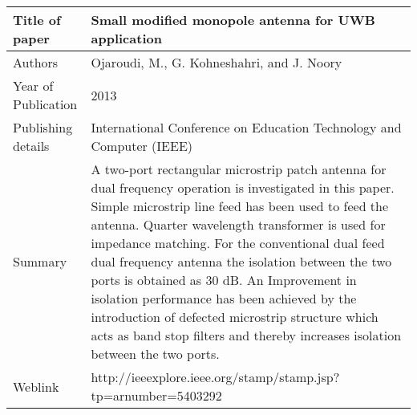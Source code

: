 \documentclass{article}
\begin{document}
\begin{table}
  \centering
	\begin{tabular}{ |l|p{11cm}| }
			\hline
		     Title of paper & Small modified monopole antenna for UWB application \\
		     \hline
			 Authors & Ojaroudi, M., G. Kohneshahri, and J. Noory \\
			\hline
			 Year of Publication & 2013 \\
			\hline
			 Publishing details & International Conference on Education Technology and Computer (IEEE) \\ \hline
			 Summary & A two-port rectangular microstrip patch antenna for dual frequency operation is investigated in this paper. Simple microstrip line feed has been used to feed the antenna. Quarter wavelength transformer is used for impedance matching. For the conventional dual feed dual frequency antenna the isolation between the two ports is obtained as 30 dB. An Improvement in isolation performance has been achieved by the introduction of defected microstrip structure which acts as band stop filters and thereby increases isolation between the two ports.\\
			\hline
			 Weblink & http://ieeexplore.ieee.org/stamp/stamp.jsp?tp=arnumber=5403292 \\
			 \hline			 
	\end{tabular}		

\end{table}
\end{document}
